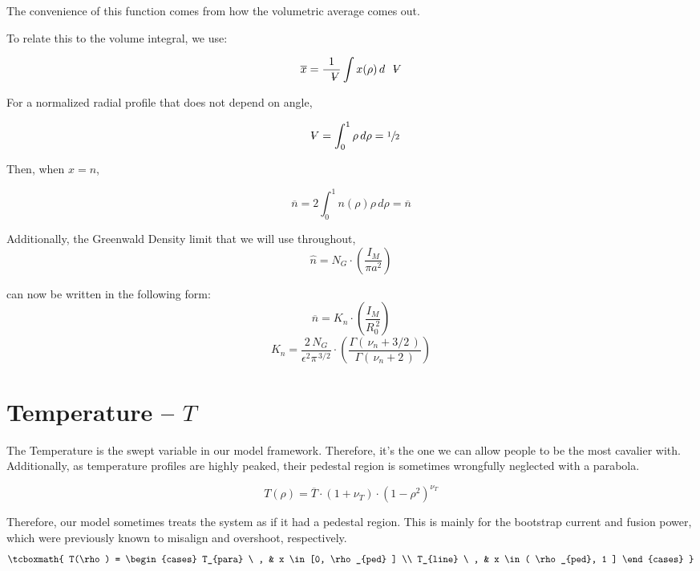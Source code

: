 The convenience of this function comes from how the volumetric average comes out.

To relate this to the volume integral, we use:

\begin{equation}
	\overline{x} = \frac{1}{\volume} \int x(\rho) \, d\volume
\end{equation}

For a normalized radial profile that does not depend on angle,

\begin{equation}
	\volume = \int_0^1 \rho \, d\rho = \sfrac{1}{2}
\end{equation}

Then, when $x = n$,

\begin{equation}
	\overline{n} = 2 \int_0^1 n(\rho) \rho \, d\rho = \overline{n}
\end{equation}

Additionally, the Greenwald Density limit that we will use throughout,
\begin{equation}
	\hat{n} = N_G \cdot \left( \frac{I_M}{\pi a^2} \right) 
\end{equation} 

can now be written in the following form:
\begin{equation}
	\overline{n} =K_{n} \cdot \left( \frac{I_M}{R_0^{\,2}} \right)
\end{equation} 
\begin{equation}
	K_n = \frac{2 \, N_G}{\epsilon^2 \pi ^ { \, 3/2} }\cdot \left( \frac{ \Gamma( \, \nu_n + 3/2 \, ) }{ \Gamma( \, \nu_n + 2 \, ) } \right)
\end{equation}

\section{Temperature -- $T$}

The Temperature is the swept variable in our model framework. Therefore, it's the one we can allow people to be the most cavalier with. Additionally, as temperature profiles are highly peaked, their pedestal region is sometimes wrongfully neglected with a parabola.

\begin{equation}
	T(\rho) = \overline{T} \cdot \left(1 + \nu_T \right) \cdot \left( 1 - \rho^2  \right)^{\nu_T}
\end{equation}

Therefore, our model sometimes treats the system as if it had a pedestal region. This is mainly for the bootstrap current and fusion power, which were previously known to misalign and overshoot, respectively.
\begin{equation}
	\tcboxmath{
	T(\rho) = 
	\begin{cases}
	    T_{para} \ , & x \in [0, \rho_{ped} ] \\
	    T_{line}   \ , & x \in ( \rho_{ped}, 1 ]
	\end{cases}
	}	
\end{equation}

